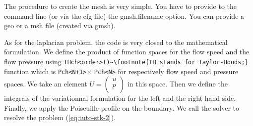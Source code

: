 The procedure to create the mesh is very simple.
You have to provide to the command line (or via the cfg file) the gmsh.filename option.
You can provide a geo or a msh file (created via gmsh).

As for the laplacian problem, the code is very closed to the mathematical formulation.
We define the product of function spaces for the flow speed and the flow pressure
using \lstinline!THch<order>()~\footnote{TH stands for Taylor-Hoods;}! function which is \lstinline!Pch<N+1>!$\times$ \lstinline!Pch<N>!
for respectively flow speed and pressure spaces.
We take an element 
$U=\left(
    \begin{array}{c}
        u \\
        p \\
    \end{array}
\right)
$
in this space. Then we define the integrals of the variationnal formulation
for the left and the right hand side. Finally, we apply the Poiseuille profile on the boundary.
We call the solver to resolve the problem (\ref{eq:tuto-stk-2}).



